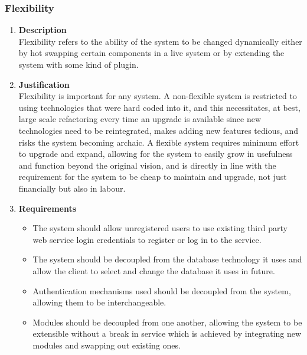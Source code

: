 \documentclass[a4paper,10pt]{article}
\begin{document}
\subsubsection{Flexibility}
\begin{enumerate}
\item \textbf{Description} \\
Flexibility refers to the ability of the system to be changed dynamically either by hot swapping certain components in a live system or by extending the system with some kind of plugin. 
\item \textbf{Justification} \\
Flexibility is important for any system. A non-flexible system is restricted to using technologies that were hard coded into it, and this necessitates, at best, large scale refactoring every time an upgrade is available since new technologies need to be reintegrated, makes adding new features tedious, and risks the system becoming archaic. A flexible system requires minimum effort to upgrade and expand, allowing for the system to easily grow in usefulness and function beyond the original vision, and is directly in line with the requirement for the system to be cheap to maintain and upgrade, not just financially but also in labour. 
\item \textbf{Requirements}
	\begin{itemize}
	\item The system should allow unregistered users to use existing third party web service login credentials to register or log in to the service.
	\item The system should be decoupled from the database technology it uses and allow the client to select and change the database it uses in future.
	\item Authentication mechanisms used should be decoupled from the system, allowing them to be interchangeable.
	\item Modules should be decoupled from one another, allowing the system to be extensible without a break in service which is achieved by integrating new modules and swapping out existing ones. 
	\end{itemize}
\end{enumerate}
\end{document}
